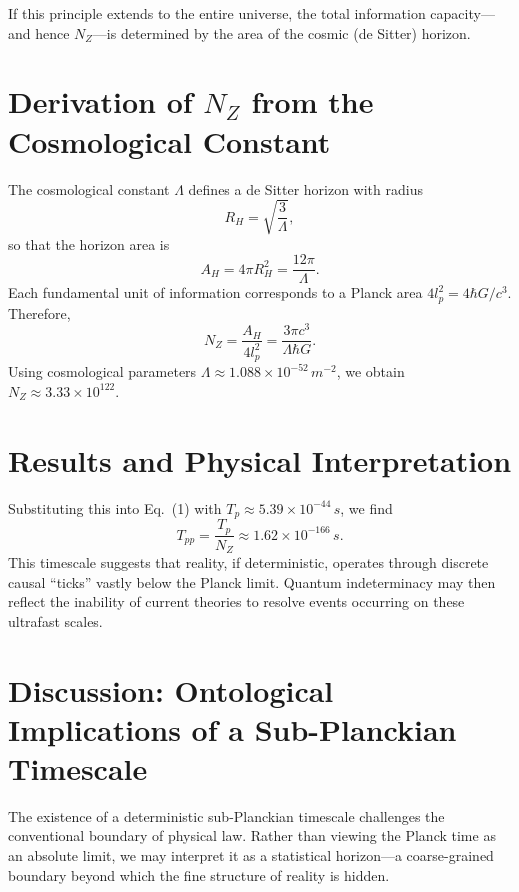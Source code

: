 \documentclass[12pt]{article}
\begin{document}
If this principle extends to the entire universe, the total information capacity---and hence $N_Z$---is determined by the area of the cosmic (de Sitter) horizon.

\section{Derivation of $N_Z$ from the Cosmological Constant}
The cosmological constant $\Lambda$ defines a de Sitter horizon with radius
\begin{equation}
R_H = \sqrt{\frac{3}{\Lambda}},
\end{equation}
so that the horizon area is
\begin{equation}
A_H = 4\pi R_H^2 = \frac{12\pi}{\Lambda}.
\end{equation}
Each fundamental unit of information corresponds to a Planck area $4l_p^2 = 4\hbar G / c^3$. Therefore,
\begin{equation}
N_Z = \frac{A_H}{4l_p^2} = \frac{3\pi c^3}{\Lambda \hbar G}.
\end{equation}
Using cosmological parameters $\Lambda \approx 1.088 \times 10^{-52}\, m^{-2}$, we obtain $N_Z \approx 3.33 \times 10^{122}$.

\section{Results and Physical Interpretation}
Substituting this into Eq.~(1) with $T_p \approx 5.39 \times 10^{-44}\,s$, we find
\begin{equation}
T_{pp} = \frac{T_p}{N_Z} \approx 1.62 \times 10^{-166}\,s.
\end{equation}
This timescale suggests that reality, if deterministic, operates through discrete causal ``ticks'' vastly below the Planck limit. Quantum indeterminacy may then reflect the inability of current theories to resolve events occurring on these ultrafast scales.

\section{Discussion: Ontological Implications of a Sub-Planckian Timescale}
The existence of a deterministic sub-Planckian timescale challenges the conventional boundary of physical law. Rather than viewing the Planck time as an absolute limit, we may interpret it as a statistical horizon---a coarse-grained boundary beyond which the fine structure of reality is hidden.
\end{document}
